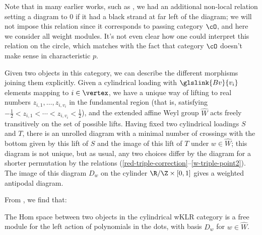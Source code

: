 \begin{remark}
Note that in many earlier works, such as \cite{Webmerged,WebRou}, we
had an additional non-local relation setting a diagram to 0 if it had
a black strand at far left of the diagram; we will not impose this relation since it corresponds to passing category $\cO$, and here we consider all weight modules.  It's not even clear how one could interpret this relation on the circle, which matches with the fact that category $\cO$ doesn't make sense in characteristic $p$.  
\end{remark}

Given two objects in this category, we can describe the different
morphisms joining them explicitly.  Given a cylindrical loading with
$\glslink{Bv}{v_i}$ elements mapping to $i\in {\vertex}$, we have a unique way of lifting to
real numbers $z_{i,1}, \dots, z_{i,v_i}$ in the fundamental region
(that is, satisfying $  -\frac{1}{2}< z_{i,1}<\cdots < z_{i,v_i}<\frac{1}{2}
$), and the extended affine Weyl group $\widehat{W}$ acts freely
transitively on the set of possible lifts.  Having fixed two
cylindrical loadings $S$ and $T$, there is an unrolled diagram with a
minimal number of crossings with 
the bottom given by this lift of $S$ and the image of this  lift of
$T$ under $w\in \widehat{W}$; this diagram is not unique, but as usual, any
two choices differ by the diagram for a shorter permutation by the
relations (\ref{red-triple-correction}--\ref{w-triple-point2}).  The
image of this diagram $D_w$ on the cylinder $\R/\Z\times [0,1]$ gives a
weighted antipodal diagram.  

From \cite[Cor. 3.12]{WebSD}, we find that: 
\begin{lemma}\label{lem:cyl-basis}
The Hom space between two objects in the cylindrical wKLR category is a
free module for the left action of polynomials in the dots, with 
basis $D_w$ for $w\in \widehat{W}$.
\end{lemma}






